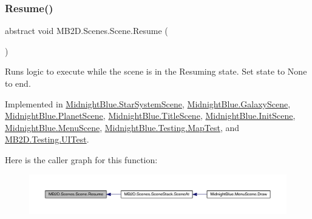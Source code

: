 \subsubsection{\texorpdfstring{Resume()}{Resume()}}
{\footnotesize\ttfamily abstract void M\+B2\+D.\+Scenes.\+Scene.\+Resume (\begin{DoxyParamCaption}{ }\end{DoxyParamCaption})\hspace{0.3cm}{\ttfamily [pure virtual]}}



Runs logic to execute while the scene is in the Resuming state. Set state to None to end. 



Implemented in \hyperlink{class_midnight_blue_1_1_star_system_scene_aefbf0750a7ce153b923bcabb132e4875}{Midnight\+Blue.\+Star\+System\+Scene}, \hyperlink{class_midnight_blue_1_1_galaxy_scene_ab641e6727cdb64dc6487e9a229521692}{Midnight\+Blue.\+Galaxy\+Scene}, \hyperlink{class_midnight_blue_1_1_planet_scene_aa14750d3675b59462796e821b3921397}{Midnight\+Blue.\+Planet\+Scene}, \hyperlink{class_midnight_blue_1_1_title_scene_afb0bb3ad8b2766b5d57537dc1ef22249}{Midnight\+Blue.\+Title\+Scene}, \hyperlink{class_midnight_blue_1_1_init_scene_a01ade76252a492d20181bd2e00eb217f}{Midnight\+Blue.\+Init\+Scene}, \hyperlink{class_midnight_blue_1_1_menu_scene_a76f8bd3add4abf16ac9962a2fb51fad2}{Midnight\+Blue.\+Menu\+Scene}, \hyperlink{class_midnight_blue_1_1_testing_1_1_map_test_aa595402e6d3702119877721f7cb3ab9f}{Midnight\+Blue.\+Testing.\+Map\+Test}, and \hyperlink{class_m_b2_d_1_1_testing_1_1_u_i_test_a933c2bf347db47bf2921709c10d78acc}{M\+B2\+D.\+Testing.\+U\+I\+Test}.

Here is the caller graph for this function\+:
\nopagebreak
\begin{figure}[H]
\begin{center}
\leavevmode
\includegraphics[width=350pt]{class_m_b2_d_1_1_scenes_1_1_scene_ad13639db22b059a1b714eefd9d927735_icgraph}
\end{center}
\end{figure}
\hypertarget{class_m_b2_d_1_1_scenes_1_1_scene_a779de7c1ab23b698dcde3a228324a991}{}\label{class_m_b2_d_1_1_scenes_1_1_scene_a779de7c1ab23b698dcde3a228324a991} 
